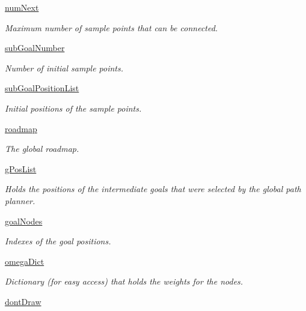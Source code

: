 \begin{DoxyCompactItemize}
\hyperlink{classprm_1_1PRMGenerator_a84795d8a1191caae0612ac645d8853b9}{num\-Next}
\begin{DoxyCompactList}\small\item\em Maximum number of sample points that can be connected. \end{DoxyCompactList}\item 
\hyperlink{classprm_1_1PRMGenerator_af8d162e83184c5493019e868e53fcefd}{sub\-Goal\-Number}
\begin{DoxyCompactList}\small\item\em Number of initial sample points. \end{DoxyCompactList}\item 
\hyperlink{classprm_1_1PRMGenerator_a6c5a8c95cfb4636e37404d2f2dce78f8}{sub\-Goal\-Position\-List}
\begin{DoxyCompactList}\small\item\em Initial positions of the sample points. \end{DoxyCompactList}\item 
\hyperlink{classprm_1_1PRMGenerator_a7fa851696426c3e1bbd7ff737cf33538}{roadmap}
\begin{DoxyCompactList}\small\item\em The global roadmap. \end{DoxyCompactList}\item 
\hyperlink{classprm_1_1PRMGenerator_a164c6ae962a75ed31d58eff1db95f141}{g\-Pos\-List}
\begin{DoxyCompactList}\small\item\em Holds the positions of the intermediate goals that were selected by the global path planner. \end{DoxyCompactList}\item 
\hyperlink{classprm_1_1PRMGenerator_af39d8001704a7437e6255ef4ca69189c}{goal\-Nodes}
\begin{DoxyCompactList}\small\item\em Indexes of the goal positions. \end{DoxyCompactList}\item 
\hyperlink{classprm_1_1PRMGenerator_ad56b6bb5da1e474ab8a8099863207de3}{omega\-Dict}
\begin{DoxyCompactList}\small\item\em Dictionary (for easy access) that holds the weights for the nodes. \end{DoxyCompactList}\item 
\hyperlink{classprm_1_1PRMGenerator_a6a92750aa0e081cc87c64e157b0ecb53}{dont\-Draw}
\end{DoxyCompactItemize}


